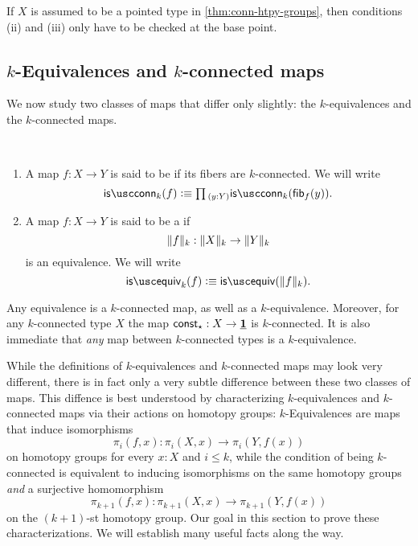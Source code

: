\begin{rmk}
  If $X$ is assumed to be a pointed type in \cref{thm:conn-htpy-groups}, then conditions (ii) and (iii) only have to be checked at the base point.
\end{rmk}

\subsection{\texorpdfstring{$k$}{k}-Equivalences and \texorpdfstring{$k$}{k}-connected maps}

We now study two classes of maps that differ only slightly: the $k$-equivalences and the $k$-connected maps. 

\begin{defn}
  ~
  \begin{enumerate}
  \item A map $f:X\to Y$ is said to be  if its fibers are $k$-connected. We will write
  \begin{equation*}
    \isconn_k(f)\defeq\prd{y:Y}\isconn_k(\fib{f}{y}).
  \end{equation*}
  \item A map $f:X\to Y$ is said to be a  if
    \begin{equation*}
      \trunc{k}{f}:\trunc{k}{X}\to\trunc{k}{Y}
    \end{equation*}
    is an equivalence. We will write
    \begin{equation*}
      \isequiv_k(f)\defeq\isequiv(\trunc{k}{f}).
    \end{equation*}
  \end{enumerate}
\end{defn}

\begin{eg}
  Any equivalence is a $k$-connected map, as well as a $k$-equivalence. Moreover, for any $k$-connected type $X$ the map $\const_\ttt:X\to\unit$ is $k$-connected. It is also immediate that \emph{any} map between $k$-connected types is a $k$-equivalence.
\end{eg}

\begin{rmk}
  While the definitions of $k$-equivalences and $k$-connected maps may look very different, there is in fact only a very subtle difference between these two classes of maps. This diffence is best understood by characterizing $k$-equivalences and $k$-connected maps via their actions on homotopy groups: $k$-Equivalences are maps that induce isomorphisms
\begin{equation*}
  \pi_i(f,x):\pi_i(X,x)\to\pi_i(Y,f(x))
\end{equation*}
on homotopy groups for every $x:X$ and $i\leq k$, while the condition of being $k$-connected is equivalent to inducing isomorphisms on the same homotopy groups \emph{and} a surjective homomorphism
\begin{equation*}
  \pi_{k+1}(f,x):\pi_{k+1}(X,x)\to\pi_{k+1}(Y,f(x))
\end{equation*}
on the $(k+1)$-st homotopy group. Our goal in this section to prove these characterizations. We will establish many useful facts along the way.
\end{rmk}


